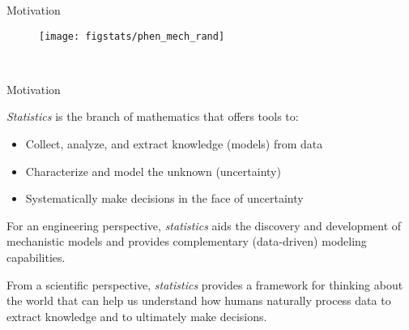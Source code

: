 \documentclass[9pt]{beamer}
\begin{document}
\begin{frame}{Motivation}



\begin{figure}[!htb]
    \centering
	\texttt{[image: figstats/phen\_mech\_rand]}
\end{figure}
\
\end{frame}


%
\begin{frame}{Motivation}

{\em Statistics} is the branch of mathematics that offers tools to: 
\begin{itemize}
 \setlength{\itemsep}{5pt}
\item Collect, analyze, and extract knowledge (models) from data 
\item Characterize and model the unknown (uncertainty) 
\item Systematically make decisions in the face of uncertainty
\end{itemize}

\begin{block}{}
For an engineering perspective, {\em statistics} aids the discovery and development of mechanistic models and provides complementary (data-driven) modeling capabilities.  
\end{block}

\begin{block}{}
From a scientific perspective, {\em statistics} provides a framework for thinking about the world that can help us understand how humans naturally process data to extract knowledge and to ultimately make decisions. 
\end{block}
\end{frame}
\end{document}
